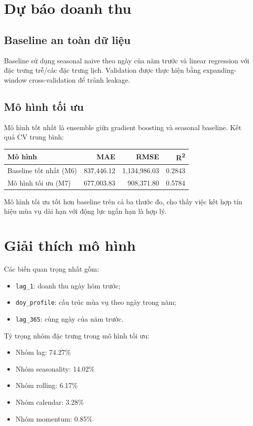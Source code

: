 \documentclass[10pt]{article}
\begin{document}
\section{Dự báo doanh thu}
\subsection{Baseline an toàn dữ liệu}
Baseline sử dụng seasonal naive theo ngày của năm trước và linear regression với đặc trưng trễ/các đặc trưng lịch. Validation được thực hiện bằng expanding-window cross-validation để tránh leakage.

\subsection{Mô hình tối ưu}
Mô hình tốt nhất là ensemble giữa gradient boosting và seasonal baseline. Kết quả CV trung bình:

\begin{table}[H]
\centering
\begin{tabular}{lrrr}
\toprule
Mô hình & MAE & RMSE & R\textsuperscript{2} \\
\midrule
Baseline tốt nhất (M6) & 837{,}446.12 & 1{,}134{,}986.03 & 0.2843 \\
Mô hình tối ưu (M7) & 677{,}003.83 & 908{,}371.80 & 0.5784 \\
\bottomrule
\end{tabular}
\end{table}

Mô hình tối ưu tốt hơn baseline trên cả ba thước đo, cho thấy việc kết hợp tín hiệu mùa vụ dài hạn với động lực ngắn hạn là hợp lý.

\section{Giải thích mô hình}
Các biến quan trọng nhất gồm:\begin{itemize}
\item \texttt{lag\_1}: doanh thu ngày hôm trước;
\item \texttt{doy\_profile}: cấu trúc mùa vụ theo ngày trong năm;
\item \texttt{lag\_365}: cùng ngày của năm trước.
\end{itemize}

Tỷ trọng nhóm đặc trưng trong mô hình tối ưu:
\begin{itemize}
\item Nhóm lag: 74.27\%
\item Nhóm seasonality: 14.02\%
\item Nhóm rolling: 6.17\%
\item Nhóm calendar: 3.28\%
\item Nhóm momentum: 0.85\%
\end{itemize}
\end{document}
